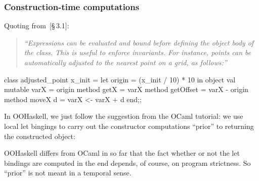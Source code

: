 \documentclass{jfp}
\begin{document}



\subsubsection{Construction-time computations}

Quoting from~\cite{OCaml}[\S\,3.1]:

\begin{quote}\itshape\small
``Expressions can be evaluated and bound before defining the object
body of the class. This is useful to enforce invariants. For instance,
points can be automatically adjusted to the nearest point on a grid,
as follows:''
\end{quote}

\begin{code}
 class adjusted_point x_init =
   let origin = (x_init / 10) * 10 in
   object
     val mutable varX = origin
     method getX      = varX
     method getOffset = varX - origin
     method moveX d   = varX <- varX + d
   end;;
\end{code}

In OOHaskell, we just follow the suggestion from the OCaml tutorial:
we use local let bingings to carry out the constructor computations
``prior'' to returning the constructed object:


OOHaskell differs from OCaml in so far that the fact whether or not
the let bindings are computed in the end depends, of course, on
program strictness. So ``prior'' is not meant in a temporal sense.



\end{document}

